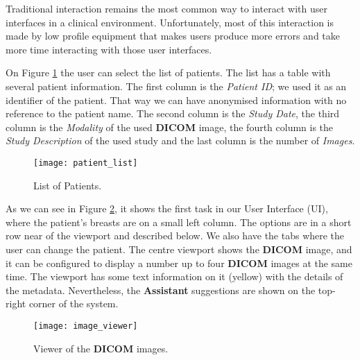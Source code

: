Traditional interaction remains the most common way to interact with user interfaces in a clinical environment. Unfortunately, most of this interaction is made by low profile equipment that makes users produce more errors and take more time interacting with those user interfaces.

On Figure \ref{fig:patient_list} the user can select the list of patients. The list has a table with several patient information. The first column is the \textit{Patient ID}; we used it as an identifier of the patient. That way we can have anonymised information with no reference to the patient name. The second column is the \textit{Study Date}, the third column is the \textit{Modality} of the used \textbf{DICOM} image, the fourth column is the \textit{Study Description} of the used study and the last column is the number of \textit{Images}.


\hfill

\begin{figure}[h]
\centering
\texttt{[image: patient\_list]}
\caption{List of Patients.}
\label{fig:patient_list}
\end{figure}

\hfill


As we can see in Figure \ref{fig:image_viewer}, it shows the first task in our User Interface (UI), where the patient's breasts are on a small left column. The options are in a short row near of the viewport and described below. We also have the tabs where the user can change the patient. The centre viewport shows the \textbf{DICOM} image, and it can be configured to display a number up to four \textbf{DICOM} images at the same time. The viewport has some text information on it (yellow) with the details of the metadata. Nevertheless, the \textbf{Assistant} suggestions are shown on the top-right corner of the system.

\clearpage


\hfill

\begin{figure}[h]
\centering
\texttt{[image: image\_viewer]}
\caption{Viewer of the \textbf{DICOM} images.}
\label{fig:image_viewer}
\end{figure}

